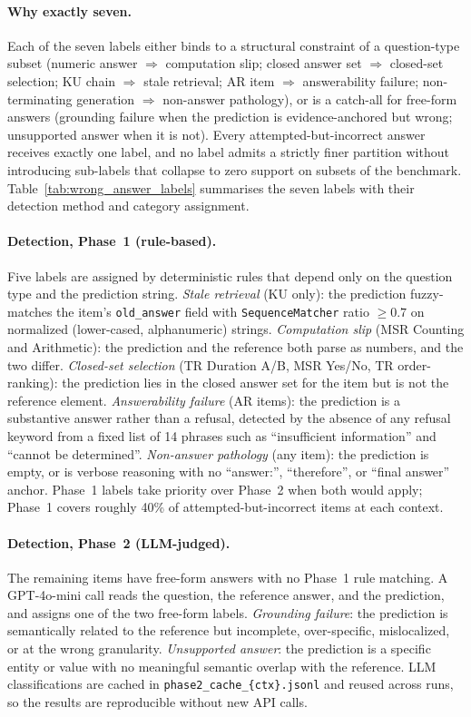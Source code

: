 \documentclass{article}
\begin{document}
\paragraph{Why exactly seven.}
Each of the seven labels either binds to a structural constraint of a
question-type subset (numeric answer $\Rightarrow$ computation slip;
closed answer set $\Rightarrow$ closed-set selection; KU chain
$\Rightarrow$ stale retrieval; AR item $\Rightarrow$ answerability
failure; non-terminating generation $\Rightarrow$ non-answer
pathology), or is a catch-all for free-form answers (grounding failure
when the prediction is evidence-anchored but wrong; unsupported answer
when it is not). Every attempted-but-incorrect answer receives exactly
one label, and no label admits a strictly finer partition without
introducing sub-labels that collapse to zero support on subsets of the
benchmark. Table~\ref{tab:wrong_answer_labels} summarises the seven labels with their detection method and category assignment.

\paragraph{Detection, Phase~1 (rule-based).}
Five labels are assigned by deterministic rules that depend only on
the question type and the prediction string.
\emph{Stale retrieval} (KU only): the prediction fuzzy-matches the
item's \texttt{old\_answer} field with \texttt{SequenceMatcher}
ratio $\geq 0.7$ on normalized (lower-cased, alphanumeric) strings.
\emph{Computation slip} (MSR Counting and Arithmetic): the prediction
and the reference both parse as numbers, and the two differ.
\emph{Closed-set selection} (TR Duration A/B, MSR Yes/No, TR order-ranking):
the prediction lies in the closed answer set for the item but is not
the reference element.
\emph{Answerability failure} (AR items): the prediction is a
substantive answer rather than a refusal, detected by the absence of
any refusal keyword from a fixed list of 14 phrases such as
``insufficient information'' and ``cannot be determined''.
\emph{Non-answer pathology} (any item): the prediction is empty, or
is verbose reasoning with no ``answer:'', ``therefore'', or ``final
answer'' anchor. Phase~1 labels take priority over Phase~2 when both
would apply; Phase~1 covers roughly 40\% of attempted-but-incorrect
items at each context.

\paragraph{Detection, Phase~2 (LLM-judged).}
The remaining items have free-form answers with no Phase~1 rule
matching. A GPT-4o-mini call reads the question, the reference
answer, and the prediction, and assigns one of the two free-form
labels. \emph{Grounding failure}: the prediction is semantically
related to the reference but incomplete, over-specific, mislocalized,
or at the wrong granularity. \emph{Unsupported answer}: the
prediction is a specific entity or value with no meaningful semantic
overlap with the reference. LLM classifications are cached in
\texttt{phase2\_cache\_\{ctx\}.jsonl} and reused across runs, so the
results are reproducible without new API calls.
\end{document}
